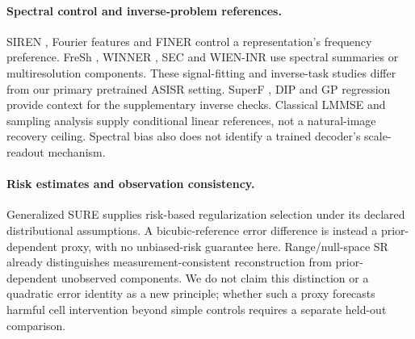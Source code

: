 \paragraph{Spectral control and inverse-problem references.}
SIREN \citep{sitzmann2020siren}, Fourier features
\citep{tancik2020fourier,jacot2018ntk} and FINER \citep{liu2024finer}
control a representation's frequency preference. FreSh
\citep{kania2025fresh}, WINNER \citep{winner2025}, SEC \citep{sec2026}
and WIEN-INR \citep{wieninr} use spectral summaries or multiresolution
components. These signal-fitting and inverse-task studies differ from
our primary pretrained ASISR setting. SuperF \citep{superf2026}, DIP
\citep{ulyanov2018dip} and GP regression \citep{rasmussen2006gp} provide
context for the supplementary inverse checks. Classical LMMSE and
sampling analysis \citep{kay1993estimation} supply conditional linear
references, not a natural-image recovery ceiling. Spectral bias
\citep{rahaman2019spectral} also does not identify a trained decoder's
scale-readout mechanism.

\paragraph{Risk estimates and observation consistency.}
Generalized SURE \citep{eldar2008gsure} supplies risk-based regularization selection under its declared distributional assumptions. A bicubic-reference error difference is instead a prior-dependent proxy, with no unbiased-risk guarantee here. Range/null-space SR \citep{wang2023nullspace} already distinguishes measurement-consistent reconstruction from prior-dependent unobserved components. We do not claim this distinction or a quadratic error identity as a new principle; whether such a proxy forecasts harmful cell intervention beyond simple controls requires a separate held-out comparison.
